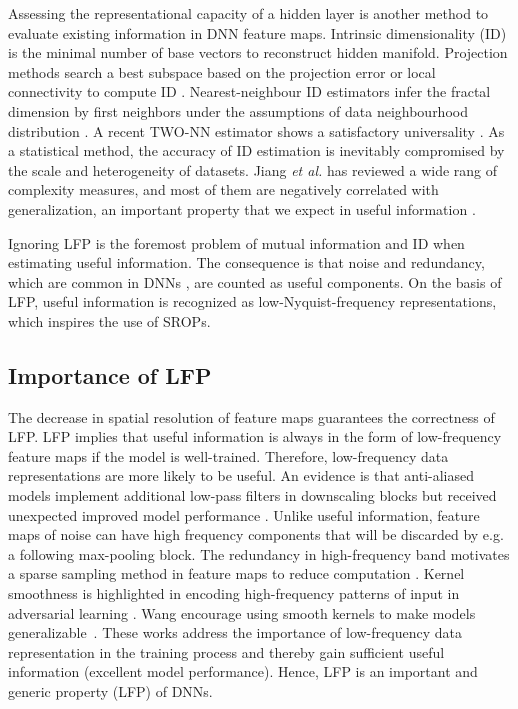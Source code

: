\documentclass{article}
\begin{document}
Assessing the representational capacity of a hidden layer is another method to evaluate existing information in DNN feature maps. Intrinsic dimensionality (ID) is the minimal number of base vectors to reconstruct hidden manifold. Projection methods search a best subspace based on the projection error or local connectivity to compute ID \cite{pca,local_conn}. Nearest-neighbour ID estimators infer the fractal dimension by first neighbors under the assumptions of data neighbourhood distribution \cite{frac}. A recent TWO-NN estimator shows a satisfactory universality \cite{nature_ID}. As a statistical method, the accuracy of ID estimation is inevitably compromised by the scale and heterogeneity of datasets. Jiang \textit{et al.} has reviewed a wide rang of complexity measures, and most of them are negatively correlated with generalization, an important property that we expect in useful information \cite{JiangNMKB20}.

Ignoring LFP is the foremost problem of mutual information and ID when estimating useful information. The consequence is that noise and redundancy, which are common in DNNs \cite{lottery}, are counted as useful components. On the basis of LFP, useful information is recognized as low-Nyquist-frequency representations, which inspires the use of SROPs.

\subsection{Importance of LFP}
The decrease in spatial resolution of feature maps guarantees the correctness of LFP. LFP implies that useful information is always in the form of low-frequency feature maps if the model is well-trained. Therefore, low-frequency data representations are more likely to be useful. An evidence is that anti-aliased models implement additional low-pass filters in downscaling blocks but received unexpected improved model performance \cite{make_conv_shift_inva}. Unlike useful information, feature maps of noise can have high frequency components that will be discarded by e.g. a following max-pooling block. The redundancy in high-frequency band motivates a sparse sampling method in feature maps to reduce computation \cite{spatially_adaptive}. Kernel smoothness is highlighted in encoding high-frequency patterns of input in adversarial learning \cite{A_Theory_of_Usable_Information_under_Computational_Constraints}.  Wang \etal encourage using smooth kernels to make models generalizable~\cite{High-Frequency-Component-Helps-Explain-the}.
These works address the importance of low-frequency data representation in the training process and thereby gain sufficient useful information (excellent model performance). Hence, LFP is an important and generic property (LFP) of DNNs. 
\end{document}
